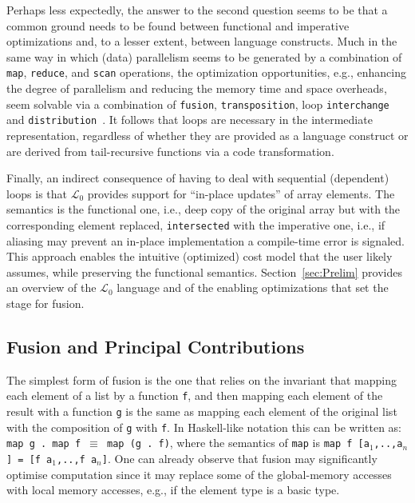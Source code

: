 \documentclass{sigplanconf}  %
\newcommand{\LO}{$\mathcal{L}_0$}
\begin{document}
Perhaps less expectedly, the answer to the second question seems to be 
that a common ground needs to be found between functional and imperative
optimizations and, to a lesser extent,  between language constructs.
Much in the same way in which (data) parallelism seems to be generated by
a combination of {\tt map}, {\tt reduce}, and {\tt scan} operations, 
the optimization opportunities, e.g., enhancing the degree of parallelism 
and reducing  the memory time and space overheads, seem solvable via a 
combination of {\tt fusion}, {\tt transposition}, loop {\tt interchange} 
and {\tt distribution}~\cite{OptCompModernArch}.
%
It follows that loops are necessary in the intermediate representation,
regardless of whether they are provided as a language construct or are
derived from tail-recursive functions via a code transformation. 

Finally, an indirect consequence of having to deal with sequential (dependent) 
loops is that \LO{} provides support for ``in-place updates'' of 
array elements. The semantics is the functional one, i.e., %
deep copy of the original array but with the corresponding element replaced,
\texttt{intersected} with the imperative one, i.e., if aliasing may prevent 
an in-place implementation a compile-time error is signaled.   This approach
enables the intuitive (optimized) cost model that the user likely assumes, 
while preserving the functional semantics. 
%
Section~\ref{sec:Prelim} provides an overview of the \LO{} language %
and of the enabling optimizations that set the stage for fusion. 


\subsection{Fusion and Principal Contributions}
\label{subsec:introfusion}

%
The simplest form of fusion is the one that
relies on the invariant that mapping each element   %
of a list by a function {\tt f}, and then mapping each element 
of the result with a function {\tt g} is the same as
mapping each element of the original list with the 
composition of {\tt g} with {\tt f}. In Haskell-like notation
this can be written as: \\ {\tt map g . map f $\equiv$ map (g . f)},
where the semantics of {\tt map} is  
{\tt map f [a$_1$,..,a$_n$] = [f a$_1$,..,f a$_n$]}.
%
One can already observe that fusion may significantly optimise 
computation since it may replace some of the global-memory
accesses with local memory accesses, e.g., if the element type
is a basic type.
%
\end{document}
